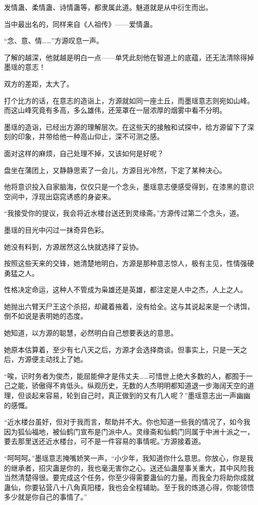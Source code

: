 \begin{this_body}
发情蛊、柔情蛊、诗情蛊等，都隶属此道。魅道就是从中衍生而出。

当中最出名的，同样来自《人祖传》——爱情蛊。

“念、意、情……”方源叹息一声。

了解的越深，他就越是明白一点——单凭此刻他在智道上的底蕴，还无法清除得掉墨瑶的意志！

双方的差距，太大了。

打个比方的话，在意志的造诣上，方源就如同一座土丘，而墨瑶意志则宛如山峰。而这山峰究竟有多高，多么雄伟，还笼罩在一层浓厚的烟雾中看不分明。

墨瑶的造诣，已经出方源的理解层次。在这些天的接触和试探中，给方源留下了深刻的印象，并带给他一种高山仰止，深不可测之感。

面对这样的麻烦，自己处理不掉，又该如何是好呢？

盘坐在蒲团上，又静静思索了一会儿，方源目光冷然，下定了某种决心。

他将意识投入自家脑海，仅仅只是一个念头，墨瑶意志便感受得到，在漆黑的意识空间中，浮现出窈窕诱惑的身姿来。

“我接受你的提议，我会将近水楼台送还到灵缘斋。”方源传过第二个念头，道。

墨瑶的目光中闪过一抹奇异色彩。

她没有料到，方源居然这么快就选择了妥协。

按照这些天来的交锋，她清楚地明白，方源是那种意志惊人，极有主见，性情强硬勇猛之人。

性格决定命运，这种人不管成为枭雄还是英雄，都注定是人中之杰，人上之人。

她抛出六臂天尸王这个杀招，却藏着掖着，没有给全。这与其说起来是一个诱饵，倒不如说是表明她的态度。

她知道，以方源的聪慧，必然明白自己想要表达的意思。

她原本估算着，至少有七八天之后，方源才会选择商谈。但事实上，只是一天之后，方源便主动找上了她。

“唉，识时务者为俊杰，能屈能伸才是伟丈夫……可惜世上绝大多数的人，都囿于一己之能，骄傲得不肯低头。纵观历史，无数的人杰明明都知道退一步海阔天空的道理，但谈起来容易，轮到自己时，真正做到的又有几人呢？”墨瑶意志出一声幽幽的感慨。

“近水楼台虽好，但对于我而言，帮助并不大。你也知道一些我的情况了，如今我因为狐仙福地，被仙鹤门宣布是门派中人。灵缘斋和仙鹤门同属于中洲十派之一，要去那里送还近水楼台，可不是一件容易的事情呢。”方源接着道。

“呵呵呵。”墨瑶意志掩嘴娇笑一声，“小少年，我知道你什么意思。你放心，你是我的继承者，招灾蛊是你的，我也毫无害你之心。送还仙蛊屋事关重大，其中风险我当然清楚得很。要完成这个任务，你至少得需要蛊仙的力量。而我全力将助你成就蛊仙，你要钻营八十八角真阳楼，我也会全程辅助。至于我的炼道心得，你能领悟多少就是你自己的事情了。”


\end{this_body}
